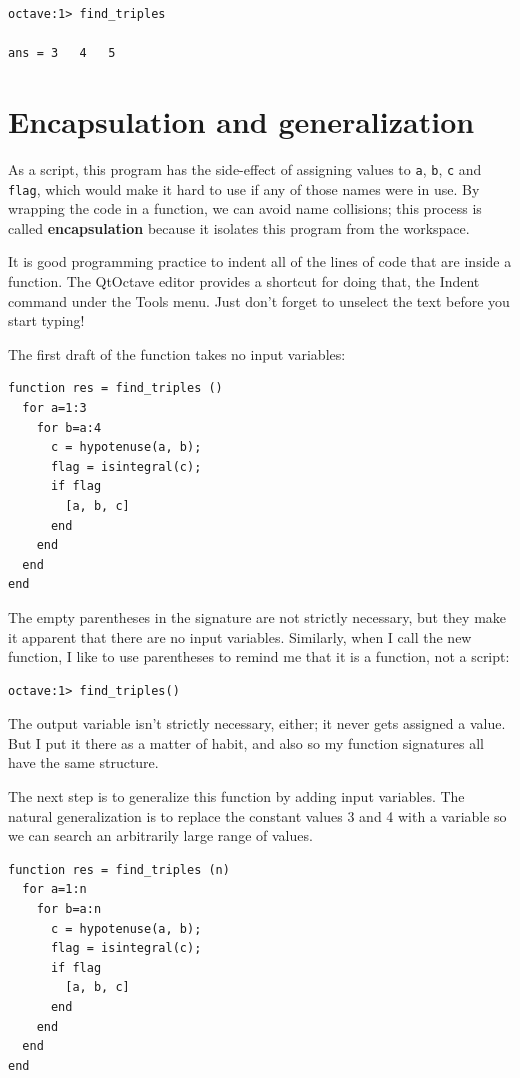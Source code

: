 \documentclass{book}
\begin{document}
\begin{verbatim}
octave:1> find_triples

ans = 3   4   5
\end{verbatim}




\section{Encapsulation and generalization}

As a script, this program has the side-effect of assigning values to
{\tt a}, {\tt b}, {\tt c} and {\tt flag}, which would make it hard to
use if any of those names were in use. By wrapping the code in a
function, we can avoid name collisions; this process is called {\bf
encapsulation} because it isolates this program from the workspace.

It is good programming practice to indent all of the lines of code that are
inside a function. The QtOctave editor provides a
shortcut for doing that, the {\sf Indent} command
under the {\sf Tools} menu. Just don't forget to unselect the
text before you start typing!

The first draft of the function takes no input variables:

\begin{verbatim}
function res = find_triples ()
  for a=1:3
    for b=a:4
      c = hypotenuse(a, b);
      flag = isintegral(c);
      if flag
        [a, b, c]
      end
    end
  end
end
\end{verbatim}

The empty parentheses in the signature are not strictly necessary, but
they make it apparent that there are no input variables. Similarly,
when I call the new function, I like to use parentheses to remind me
that it is a function, not a script:

\begin{verbatim}
octave:1> find_triples()
\end{verbatim}

The output variable isn't strictly necessary, either; it
never gets assigned a value. But I put it there as a matter of
habit, and also so my function signatures all have the same structure.

The next step is to generalize this function by adding input
variables. The natural generalization is to replace the constant
values 3 and 4 with a variable so we can search an arbitrarily large
range of values.

\begin{verbatim}
function res = find_triples (n)
  for a=1:n
    for b=a:n
      c = hypotenuse(a, b);
      flag = isintegral(c);
      if flag
        [a, b, c]
      end
    end
  end
end
\end{verbatim}
\end{document}
